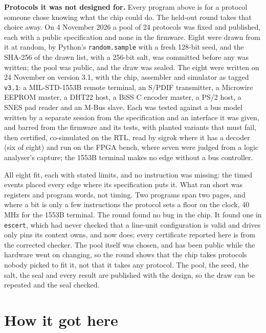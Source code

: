 \documentclass[conference,letterpaper]{IEEEtran}
\begin{document}
\textbf{Protocols it was not designed for.} Every program above is for a protocol someone
chose knowing what the chip could do. The held-out round takes that choice away. On 4 November 2026 a pool of 24 protocols was fixed and published, each with a public
specification and none in the firmware. Eight were drawn from it at random, by Python's
\texttt{random.sample} with a fresh 128-bit seed, and the SHA-256 of the drawn list, with
a 256-bit salt, was committed before any was written; the pool was public, and the draw
was sealed. The eight were written on 24 November on version 3.1, with the chip, assembler
and simulator as tagged \texttt{v3.1}: a
MIL-STD-1553B remote terminal, an S/PDIF transmitter, a Microwire EEPROM master, a DHT22
host, a BiSS C encoder master, a PS/2 host, a SNES pad reader and an M-Bus slave. Each was
tested against a bus model written by a separate session from the specification and an
interface it was given, and barred from the firmware and its tests, with planted
variants that must fail, then certified, co-simulated on the RTL, read by sigrok where it
has a decoder (six of eight) and run on the FPGA bench, where seven were judged from a logic
analyser's capture; the 1553B terminal makes no edge without a bus controller.

All eight fit, each with stated limits, and no instruction was missing: the timed events
placed every edge where its specification puts it. What ran short was registers and
program words, not timing. Two programs span two pages, and where a bit is only a few
instructions the protocol sets a floor on the clock, 40\,MHz for the 1553B terminal. The
round found no bug in the chip. It found one in \texttt{escert}, which had never checked
that a line-unit configuration is valid and drives only pins its context owns, and now
does; every certificate reported here is from the corrected checker. The pool itself was chosen, and has been public while the hardware went on changing, so the
round shows that the chip takes protocols nobody picked to fit it, not that it takes any
protocol. The pool, the seed, the salt, the seal and every result are published with the
design, so the draw can be repeated and the seal checked.

\section{How it got here}
\label{sec:history}
\end{document}
